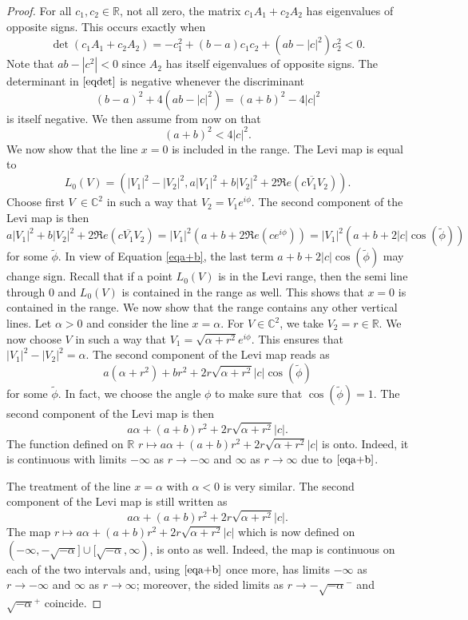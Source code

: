 \documentclass[12pt]{amsart}
\newcommand{\C}{\mathbb C}
\newcommand{\R}{\mathbb R}
\theoremstyle{remark}
\theoremstyle{example}
\theoremstyle{definition}
\numberwithin{equation}{section}
\begin{document}
\begin{proof}
For all $c_1,c_2 \in \R$, not all zero,  the matrix $c_1A_1+c_2A_2$ has eigenvalues of opposite signs. This occurs exactly when 
\begin{equation}\label{eqdet}
\det (c_1A_1+c_2A_2)=-c_1^2+(b-a)c_1c_2+(ab-|c|^2)c_2^2 < 0.
\end{equation}
Note that $ab-|c^2|<0$ since $A_2$ has itself eigenvalues of opposite signs. The determinant in $\eqref{eqdet}$ is negative whenever the discriminant
$$(b-a)^2+4(ab-|c|^2)=(a+b)^2-4|c|^2$$
is itself negative. We then assume from now on that 
\begin{equation}\label{eqa+b}
(a+b)^2<4|c|^2.
\end{equation}
We now show that the line $x=0$ is included in the range. 
The Levi map is equal to $$L_0(V)=\left(|V_1|^2-|V_2|^2,a|V_1|^2+b|V_2|^2+2\Re e (c\overline{V_1}V_2)\right).$$
Choose first $V \ \in \C^2$ in such a way that $V_2=V_1e^{i\phi}$. The second component of the Levi map is then 
$$a|V_1|^2+b|V_2|^2+2\Re e (c\overline{V_1}V_2)=|V_1|^2\left(a+b+2\Re e (ce^{i\phi})\right)=|V_1|^2\left(a+b+2|c|\cos (\tilde{\phi})\right)$$
for some $\tilde{\phi}$. 
In view of Equation \eqref{eqa+b}, the last term $a+b+2|c|\cos (\tilde{\phi})$ may change sign. Recall that if a point $L_0(V)$ is in the Levi range, then the semi line through $0$ and $L_0(V)$  is contained in the range as well. This shows that   $x=0$ is contained in the range.   
 We now show that the range contains any other vertical lines. Let $\alpha>0$ and consider the line $x=\alpha$.  For $V \in \C^2$, we take $V_2=r \in \R$. We now choose $V$ in such a way that $V_1=\sqrt{\alpha+r^2}e^{i\phi}$. This ensures that $|V_1|^2-|V_2|^2=\alpha$.  
 The second component of the Levi map reads as
 $$a(\alpha+r^2)+br^2+2r\sqrt{\alpha+r^2}|c|\cos(\tilde{\phi})$$
 for some  $\tilde{\phi}$. In fact, we choose the angle $\phi$ to make sure that $\cos(\tilde{\phi})=1$. The second component of the Levi map is then 
 $$a\alpha+(a+b)r^2+2r\sqrt{\alpha+r^2}|c|.$$
The function  defined on $\R$ $r \mapsto a\alpha+(a+b)r^2+2r\sqrt{\alpha+r^2}|c|$ is onto. Indeed, it is continuous with limits $-\infty$ as $r \to -\infty$ and $\infty$ as $r\to \infty$ due to  $\eqref{eqa+b}$. 

            
 
The treatment of the  line $x=\alpha$ with  $\alpha<0$ is very similar.  The second component of the Levi map is still written as 
 $$a\alpha+(a+b)r^2+2r\sqrt{\alpha+r^2}|c|.$$
 The map $r \mapsto a\alpha+(a+b)r^2+2r\sqrt{\alpha+r^2}|c|$ which is now defined on $(-\infty,-\sqrt{-\alpha}] \cup [\sqrt{-\alpha},\infty)$, is onto as well. Indeed, the map is continuous on each of the two intervals and, using $\eqref{eqa+b}$ once more, has limits $-\infty$ as $r\to -\infty$ and  $\infty$ as $r\to \infty$; moreover, the sided limits as $r \to -\sqrt{-\alpha}^-$ and $\sqrt{-\alpha}^+$ coincide.  
 \end{proof}
\end{document}
